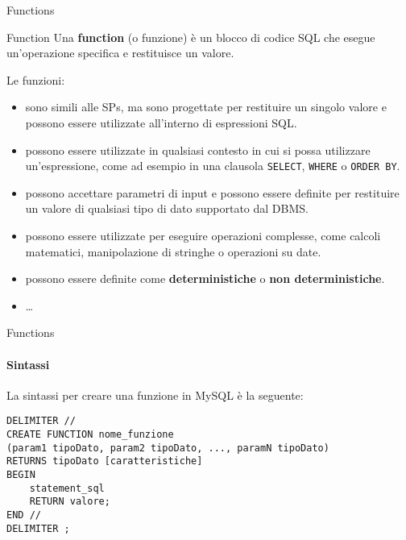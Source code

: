 \newcommand{\xmark}{\textcolor{black}{\ding{55}}}
\renewcommand{\checkmark}{\textcolor{black}{\ding{51}}}
\begin{frame}[fragile]{Functions}
\vspace{-.7cm}
\begin{minipage}{.85\textwidth}
\begin{block}{Function}
Una \textbf{function} (o funzione) \`e un blocco di codice SQL che esegue un'operazione specifica e restituisce un valore.
\end{block}
\end{minipage}

\vspace{.2cm}

Le funzioni:
\begin{itemize}[<+->]
    \item sono simili alle SPs, ma sono progettate per restituire un singolo valore e possono essere utilizzate all'interno di espressioni SQL.
    \item possono essere utilizzate in qualsiasi contesto in cui si possa utilizzare un'espressione, come ad esempio in una clausola \texttt{SELECT}, \texttt{WHERE} o \texttt{ORDER BY}.
    \item possono accettare parametri di input e possono essere definite per restituire un valore di qualsiasi tipo di dato supportato dal DBMS.
    \item possono essere utilizzate per eseguire operazioni complesse, come calcoli matematici, manipolazione di stringhe o operazioni su date.
    \item possono essere definite come \textbf{deterministiche} o \textbf{non deterministiche}.
    \item \ldots
\end{itemize}
\end{frame}
%
\begin{frame}[fragile]{Functions}
\framesubtitle{Sintassi}
\vspace{-1cm}
La sintassi per creare una funzione in MySQL \`e la seguente:

\begin{lstlisting}
DELIMITER //
CREATE FUNCTION nome_funzione
(param1 tipoDato, param2 tipoDato, ..., paramN tipoDato)
RETURNS tipoDato [caratteristiche]
BEGIN
    statement_sql
    RETURN valore;
END //
DELIMITER ;
\end{lstlisting}
\end{frame}
%
